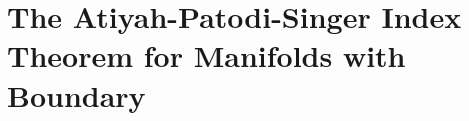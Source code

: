 \section{The Atiyah-Patodi-Singer Index Theorem for Manifolds with Boundary}
\label{sec:chap17_sec1}

